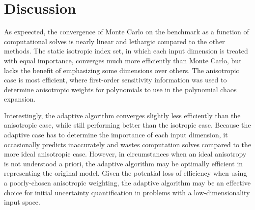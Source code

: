 \documentclass{anstrans} \usepackage{amsmath} \usepackage{amssymb}
\begin{document}
\section{Discussion}
As expeected, the convergence of Monte Carlo on the benchmark as a function of computational solves is nearly
linear and lethargic compared to the other methods.  The static isotropic index set, in which each input
dimension is treated with equal importance, converges much more efficiently than Monte Carlo, but lacks the
benefit of emphasizing some dimensions over others.  The anisotropic case is most efficient, where first-order
sensitivity information was used to determine anisotropic weights for polynomials to use in the polynomial
chaos expansion.  

Interestingly, the adaptive algorithm converges slightly less efficiently than the anisotropic case, while
still performing better than the isotropic case.  Because the adaptive case has to determine the importance of
each input dimension, it occasionally predicts inaccurately and wastes computation solves compared to the more
ideal anisotropic case.  However, in circumstances when an ideal anisotropy is not understood a priori, the
adaptive algorithm may be optimally efficient in representing the original model.  Given the potential loss of
efficiency when using a poorly-chosen anisotropic weighting, the adaptive algorithm may be an effective choice
for initial uncertainty quantification in problems with a low-dimensionality input space.

{}  
\end{document}
